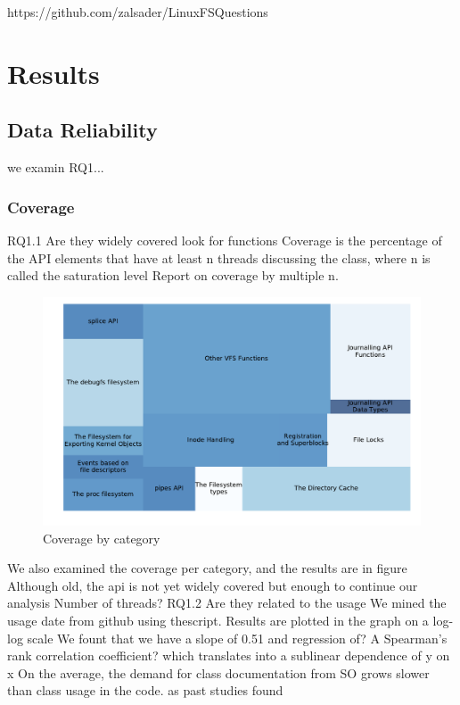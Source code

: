 https://github.com/zalsader/LinuxFSQuestions

\section{Results} \label{sec:results}
\subsection{Data Reliability}
we examin RQ1...
\subsubsection{Coverage}
RQ1.1
Are they widely covered
look for functions
Coverage is the percentage of the API elements that have at least n threads discussing
the class, where n is called the saturation level
Report on coverage by multiple n. %
\begin{figure}[t!]
  \includegraphics{scripts/figures/1-1-coveragebycategory.pdf}
  \caption{Coverage by category}
  \label{fig:covbycategory}
\end{figure}

We also examined the coverage per category, and the results are in figure
Although old, the api is not yet widely covered
but enough to continue our analysis
Number of threads? %
RQ1.2
Are they related to the usage
We mined the usage date from github using thescript.
Results are plotted in the graph on a log-log scale
We fount that we have a slope of 0.51 and regression of? %
A Spearman’s rank correlation coefficient?
which translates into a sublinear dependence of y on x
On the average, the demand for class documentation from SO grows slower
than class usage in the code. as past studies found


